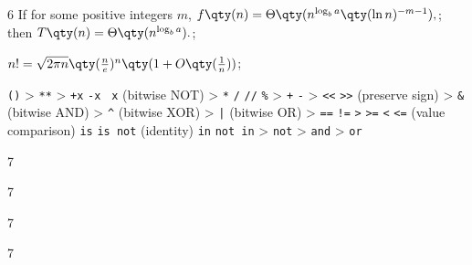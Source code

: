 \documentclass[a4paper,10pt]{extarticle}
\begin{document}
\begin{multicols}{6}
If for some positive integers $m$,
\(f\qty(n)=\Theta\qty(n^{\log_ba}\qty(\ln n)^{-m-1}),\); 
then
\(T\qty(n)=\Theta\qty(n^{\log_ba}).\); 


\(n!=\sqrt{2\pi n}\qty(\frac{n}{e})^n\qty(1+O\qty(\frac{1}{n}))\);


\texttt{()} > \texttt{**} > \texttt{+x} \texttt{-x} \texttt{~x} (bitwise NOT) > \texttt{*} \texttt{/} \texttt{//} \texttt{\%} > \texttt{+} \texttt{-} > \texttt{<<} \texttt{>>} (preserve sign) > \texttt{\&} (bitwise AND) > \texttt{\^} (bitwise XOR) > \texttt{|} (bitwise OR) > \texttt{==} \texttt{!=} \texttt{>} \texttt{>=} \texttt{<} \texttt{<=} (value comparison) \texttt{is} \texttt{is not} (identity) \texttt{in} \texttt{not in} > \texttt{not} > \texttt{and} > \texttt{or}

\end{multicols}

\pagebreak

\fontsize{4pt}{5pt}\selectfont
\begin{multicols}{7}





\end{multicols}
\noindent\makebox[\linewidth]{\rule[0.4pt]{\paperwidth}{0.4pt}}
\begin{multicols}{7}



\end{multicols}
\noindent\makebox[\linewidth]{\rule[0.4pt]{\paperwidth}{0.4pt}}
\begin{multicols}{7}



\end{multicols}
\noindent\makebox[\linewidth]{\rule[0.4pt]{\paperwidth}{0.4pt}}
\begin{multicols}{7}



\end{multicols}
\end{document}
